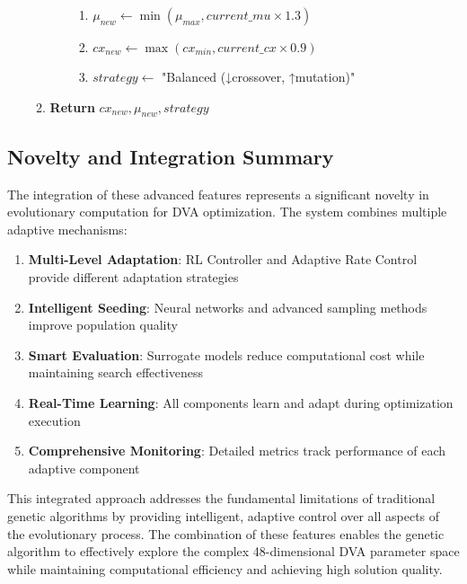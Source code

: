 \documentclass[12pt,a4paper]{article}
\begin{document}
\begin{algorithm}
\begin{enumerate}
\begin{enumerate}
\begin{enumerate}
            \begin{enumerate}
                \item $\mu_{new} \leftarrow \min(\mu_{max}, current\_mu \times 1.3)$
                \item $cx_{new} \leftarrow \max(cx_{min}, current\_cx \times 0.9)$
                \item $strategy \leftarrow$ "Balanced (↓crossover, ↑mutation)"
            \end{enumerate}
        \end{enumerate}
        \item \textbf{Return} $cx_{new}, \mu_{new}, strategy$
    \end{enumerate}
\end{enumerate}
\end{algorithm}

\subsection{Novelty and Integration Summary}

The integration of these advanced features represents a significant novelty in evolutionary computation for DVA optimization. The system combines multiple adaptive mechanisms:

\begin{enumerate}
    \item \textbf{Multi-Level Adaptation}: RL Controller and Adaptive Rate Control provide different adaptation strategies
    \item \textbf{Intelligent Seeding}: Neural networks and advanced sampling methods improve population quality
    \item \textbf{Smart Evaluation}: Surrogate models reduce computational cost while maintaining search effectiveness
    \item \textbf{Real-Time Learning}: All components learn and adapt during optimization execution
    \item \textbf{Comprehensive Monitoring}: Detailed metrics track performance of each adaptive component
\end{enumerate}

This integrated approach addresses the fundamental limitations of traditional genetic algorithms by providing intelligent, adaptive control over all aspects of the evolutionary process. The combination of these features enables the genetic algorithm to effectively explore the complex 48-dimensional DVA parameter space while maintaining computational efficiency and achieving high solution quality.
\end{document}
